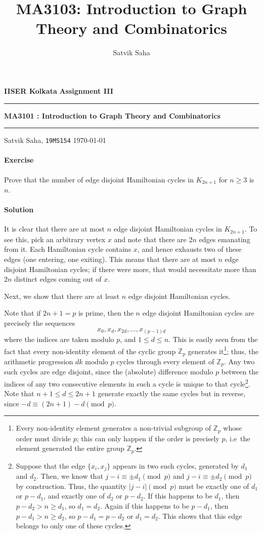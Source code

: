 \documentclass[10pt]{article}
\title{MA3103: Introduction to Graph Theory and Combinatorics}
\author{Satvik Saha}
\date{}
\newcounter{prob}
\newcommand{\problem}{\stepcounter{prob}\paragraph{Exercise \arabic{prob}}}
\newcommand{\solution}{\paragraph{Solution}}
\newcommand{\Z}{\mathbb{Z}}
\begin{document}
    \noindent\textbf{IISER Kolkata} \hfill \textbf{Assignment III}
    \vspace{3pt}
    \hrule
    \vspace{3pt}
    \begin{center}
    \LARGE{\textbf{MA3101 : Introduction to Graph Theory and Combinatorics}}
    \end{center}
    \vspace{3pt}
    \hrule
    \vspace{3pt}
    Satvik Saha, \texttt{19MS154} \hfill \today
    \vspace{20pt}

    \problem Prove that the number of edge disjoint Hamiltonian cycles in $K_{2n +
    1}$ for $n \geq 3$ is $n$.

    \solution It is clear that there are at most $n$ edge disjoint Hamiltonian cycles
    in $K_{2n + 1}$. To see this, pick an arbitrary vertex $x$ and note that there
    are $2n$ edges emanating from it. Each Hamiltonian cycle contains $x$, and hence
    exhausts two of these edges (one entering, one exiting). This means that there
    are at most $n$ edge disjoint Hamiltonian cycles; if there were more, that would
    necessitate more than $2n$ distinct edges coming out of $x$.

    Next, we show that there are at least $n$ edge disjoint Hamiltonian cycles. 

    Note that if $2n + 1 = p$ is prime, then the $n$ edge disjoint Hamiltonian cycles
    are precisely the sequences \[
        x_{0}, x_{d}, x_{2d}, \dots, x_{(p - 1)d}
    \] where the indices are taken modulo $p$, and $1 \leq d \leq n$. This is easily
    seen from the fact that every non-identity element of the cyclic group $\Z_p$
    generates it\footnote{Every non-identity element generates a non-trivial
    subgroup of $\Z_p$ whose order must divide $p$; this can only happen if the order
    is precisely $p$, i.e\ the element generated the entire group $\Z_p$.}; thus, the
    arithmetic progression $dk$ modulo $p$ cycles through every element of $\Z_p$.
    Any two such cycles are edge disjoint, since the (absolute) difference modulo $p$
    between the indices of any two consecutive elements in such a cycle is unique to
    that cycle\footnote{Suppose that the edge $\{x_i, x_j\}$ appears in two such
    cycles, generated by $d_1$ and $d_2$. Then, we know that $j - i \equiv \pm d_1
    \pmod{p}$ and $j - i \equiv \pm d_2 \pmod{p}$ by construction. Thus, the quantity
    $|j - i| \pmod{p}$ must be exactly one of $d_1$ or $p - d_1$, and exactly one of
    $d_2$ or $p - d_2$. If this happens to be $d_1$, then $p - d_2 > n \geq d_1$, so
    $d_1 = d_2$. Again if this happens to be $p - d_1$, then $p - d_1 > n \geq d_2$,
    so $p - d_1 = p - d_2$ or $d_1 = d_2$. This shows that this edge belongs to only
    one of these cycles.}. Note that $n + 1 \leq d \leq 2n + 1$ generate exactly the
    same cycles but in reverse, since $-d \equiv (2n + 1) - d \pmod{p}$.
\end{document}
